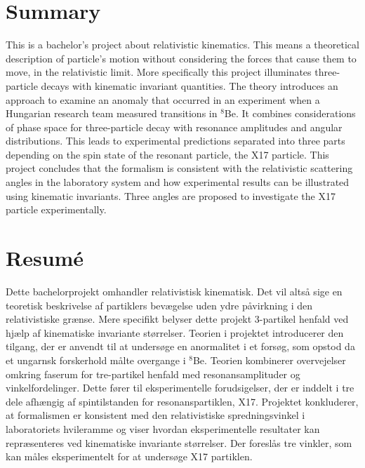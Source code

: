 \section*{Summary}
\thispagestyle{empty}
This is a bachelor's project about relativistic kinematics. This means a theoretical description of particle's motion without considering the forces that cause them to move, in the relativistic limit. More specifically this project illuminates three-particle decays with kinematic invariant quantities. The theory introduces an approach to examine an anomaly that occurred in an experiment when a Hungarian research team measured transitions in $^8$Be. It combines considerations of phase space for three-particle decay with resonance amplitudes and angular distributions. This leads to experimental predictions separated into three parts depending on the spin state of the resonant particle, the X17 particle. This project concludes that the formalism is consistent with the relativistic scattering angles in the laboratory system and how experimental results can be illustrated using kinematic invariants. Three angles are proposed to investigate the X17 particle experimentally.  
\vspace{1cm}
\section*{Resumé}
Dette bachelorprojekt omhandler relativistisk kinematisk. Det vil altså sige en teoretisk beskrivelse af partiklers bevægelse uden ydre påvirkning i den relativistiske grænse. Mere specifikt belyser dette projekt 3-partikel henfald ved hjælp af kinematiske invariante størrelser. Teorien i projektet introducerer den tilgang, der er anvendt til at undersøge en anormalitet i et forsøg, som opstod da et ungarnsk forskerhold målte overgange i $^8$Be. Teorien kombinerer overvejelser omkring faserum for tre-partikel henfald med resonansamplituder og vinkelfordelinger. Dette fører til eksperimentelle forudsigelser, der er inddelt i tre dele afhængig af spintilstanden for resonanspartiklen, X17. Projektet konkluderer, at formalismen er konsistent med den relativistiske spredningsvinkel i laboratoriets hvileramme og viser hvordan eksperimentelle resultater kan repræsenteres ved kinematiske invariante størrelser. Der foreslås tre vinkler, som kan måles eksperimentelt for at undersøge X17 partiklen.
\newpage



